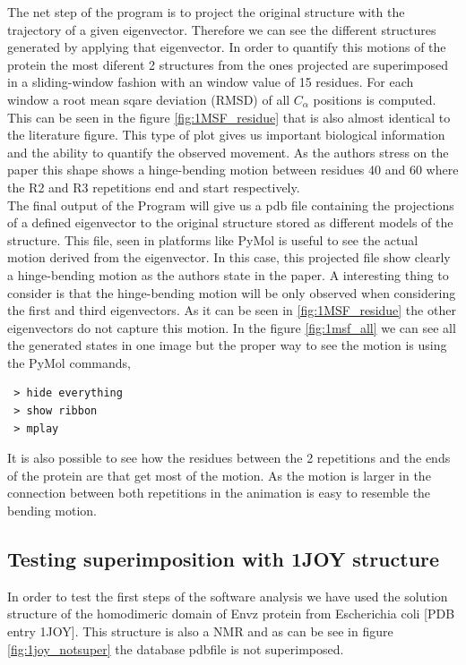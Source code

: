 \documentclass[12pt]{article}
\begin{document}
The net step of the program is to project the original structure with the trajectory of a given eigenvector. Therefore we can see the different structures generated by applying that eigenvector. In order to quantify this motions of the protein the most diferent 2 structures from the ones projected are superimposed in a sliding-window fashion with an window value of 15 residues. For each window a root mean sqare deviation (RMSD) of all $C_{\alpha}$ positions is computed. This can be seen in the figure \ref{fig:1MSF_residue} that is also almost identical to the literature figure\citep{VanAalten1998}. This type of plot gives us important biological information and the ability to quantify the observed movement. As the authors stress on the paper\citep{VanAalten1998} this shape shows a hinge-bending motion between residues 40 and 60 where the R2 and R3 repetitions end and start respectively.\\

The final output of the Program will give us a pdb file containing the projections of a defined eigenvector to the original structure stored as different models of the structure. This file, seen in platforms like PyMol\citep{PyMOL} is useful to see the actual motion derived from the eigenvector. In this case, this projected file show clearly a hinge-bending motion as the authors state in the paper. A interesting thing to consider is that the hinge-bending motion will be only observed when considering the first and third eigenvectors. As it can be seen in \ref{fig:1MSF_residue} the other eigenvectors do not capture this motion. In the figure \ref{fig:1msf_all} we can see all the generated states in one image but the proper way to see the motion is using the PyMol commands, 
\begin{lstlisting}
 > hide everything
 > show ribbon 
 > mplay
 \end{lstlisting}
 
It is also possible to see how the residues between the 2 repetitions and the ends of the protein are that get most of the motion. As the motion is larger in the connection between both repetitions in the animation is easy to resemble the bending motion. 



\subsection{Testing superimposition with 1JOY structure}
In order to test the first steps of the software analysis we have used the solution structure of the homodimeric domain of Envz protein from Escherichia coli [PDB entry 1JOY\citep{Tomomori1999}]. This structure is also a NMR and as can be see in figure \ref{fig:1joy_notsuper} the database pdbfile is not superimposed.  
\end{document}

